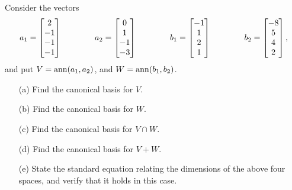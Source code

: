 \documentclass[a4paper]{article}
\begin{document}
\begin{problem}[2012-13 resit]
 Consider the vectors
 \[
   a_1 = \left[\begin{matrix} 2  \\ -1 \\ -1 \\ -1 \end{matrix}\right] \hspace{4em}
   a_2 = \left[\begin{matrix} 0  \\  1 \\ -1 \\ -3 \end{matrix}\right] \hspace{4em}
   b_1 = \left[\begin{matrix} -1 \\  1 \\  2 \\  1 \end{matrix}\right] \hspace{4em}
   b_2 = \left[\begin{matrix} -8 \\  5 \\  4 \\  2 \end{matrix}\right],
 \]
 and put $V=\operatorname{ann}(a_1,a_2)$, and $W=\operatorname{ann}(b_1,b_2)$.
 \begin{itemize}
  \item[(a)] Find the canonical basis for $V$. 
  \item[(b)] Find the canonical basis for $W$. 
  \item[(c)] Find the canonical basis for $V\cap W$. 
  \item[(d)] Find the canonical basis for $V+W$. 
  \item[(e)] State the standard equation relating the dimensions
   of the above four spaces, and verify that it holds in this case.
 \end{itemize}
\end{problem}
\end{document}
